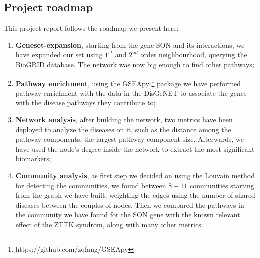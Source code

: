 \subsection{Project roadmap}\label{subsec:project_roadmap}
This project report follows the roadmap we present here:
\begin{enumerate}
    \item \textbf{Geneset-expansion}, starting from the gene SON and its interactions, we have expanded our set using $1^{st}$ and $2^{nd}$ order neighbourhood, querying the BioGRID \cite{biogrid} database. The network was now big enough to find other pathways;
    \item \textbf{Pathway enrichment}, using the GSEApy \footnote{https://github.com/zqfang/GSEApy} package we have performed pathway enrichment with the data in the DisGeNET \cite{disgenet} to  associate the genes with the disease pathways they contribute to;
    \item\textbf{Network analysis}, after building the network, two metrics have been deployed to analyze the diseases on it, such as the distance among the pathway components, the largest pathway component size. Afterwards, we have used the node's degree inside the network to extract the most significant biomarkers;
    \item \textbf{Community analysis}, as first step we decided on using the Louvain method for detecting the communities, we found between $8-11$ communities starting from the graph we have built, weighting the edges using the number of shared diseases between the couples of nodes. Then we compared the pathways in the community we have found for the SON gene with the known relevant effect of the ZTTK syndrom, along with many other metrics.
\end{enumerate}